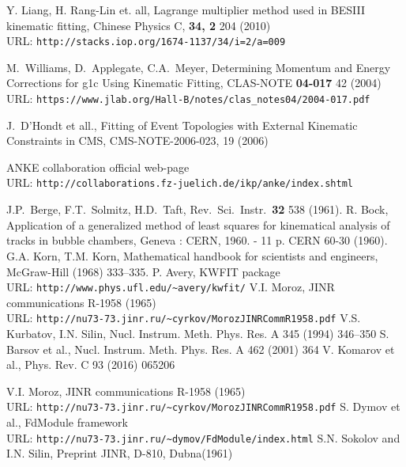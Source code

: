\begin{thebibliography}{00}
 Y. Liang, H. Rang-Lin et. all, Lagrange multiplier method used in BESIII kinematic fitting, Chinese Physics C, \textbf{34, 2} 204 (2010) \\ URL: \texttt{http://stacks.iop.org/1674-1137/34/i=2/a=009}

 M.~Williams, D.~Applegate, C.A.~Meyer, Determining Momentum and Energy Corrections for g1c Using Kinematic Fitting, CLAS-NOTE \textbf{04-017} 42 (2004)  \\ URL: \texttt{https://www.jlab.org/Hall-B/notes/clas\_notes04/2004-017.pdf}

 J.~D'Hondt et all., Fitting of Event Topologies with External Kinematic Constraints in CMS, CMS-NOTE-2006-023, 19 (2006)

 ANKE collaboration official web-page\\ URL: \texttt{http://collaborations.fz-juelich.de/ikp/anke/index.shtml}

 J.P.~Berge, F.T.~Solmitz, H.D.~Taft, Rev.\ Sci.\ Instr.\ \textbf{32} 538 (1961).
 R. Bock, Application of a generalized method of least squares for kinematical analysis of tracks in bubble chambers,       Geneva : CERN, 1960. - 11 p. CERN 60-30 (1960).
 G.A. Korn, T.M. Korn, Mathematical handbook for scientists and engineers, McGraw-Hill (1968) 333--335.
 P. Avery, KWFIT package\\ URL: \texttt{http://www.phys.ufl.edu/\textasciitilde{}avery/kwfit/}
 V.I. Moroz, JINR communications R-1958 (1965)\\ URL: \texttt{http://nu73-73.jinr.ru/\textasciitilde{}cyrkov/MorozJINRCommR1958.pdf}
 V.S. Kurbatov, I.N. Silin, Nucl. Instrum. Meth. Phys. Res. A 345 (1994) 346--350
 S. Barsov et al., Nucl. Instrum. Meth. Phys. Res. A 462 (2001) 364
 V. Komarov et al., Phys. Rev. C 93 (2016) 065206

 V.I. Moroz, JINR communications R-1958 (1965)\\ URL: \texttt{http://nu73-73.jinr.ru/\textasciitilde{}cyrkov/MorozJINRCommR1958.pdf}
 S. Dymov et al., FdModule framework\\ URL: \texttt{http://nu73-73.jinr.ru/\textasciitilde{}dymov/FdModule/index.html}
 S.N. Sokolov and I.N. Silin, Preprint JINR, D-810, Dubna(1961)


\end{thebibliography}
